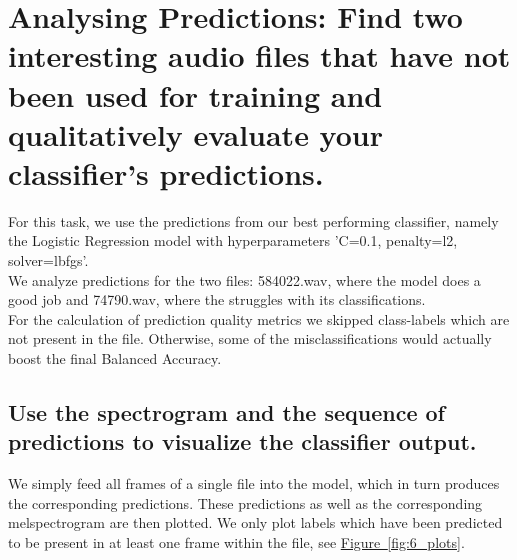 
\section{Analysing Predictions: {\normalfont\normalsize Find two interesting audio files that have not been used for training and qualitatively evaluate your classifier’s predictions.}}
\label{sec:Analysing Predictions}

For this task, we use the predictions from our best performing classifier, namely the Logistic Regression model with hyperparameters 'C=0.1, penalty=l2, solver=lbfgs'.\\
We analyze predictions for the two files: 584022.wav, where the model does a good job and 74790.wav, where the struggles with its classifications. \\
For the calculation of prediction quality metrics we skipped class-labels which are not present in the file. Otherwise, some of the misclassifications would actually boost the final Balanced Accuracy.


\subsection{Use the spectrogram and the sequence of predictions to visualize the classifier output. }
\label{sec:Analysing Predictions:a}
We simply feed all frames of a single file into the model, which in turn produces the corresponding predictions. These predictions as well as the corresponding melspectrogram are then plotted. We only plot labels which have been predicted to be present in at least one frame within the file, see \hyperref[fig:6_plots]{Figure~\ref*{fig:6_plots}}.

